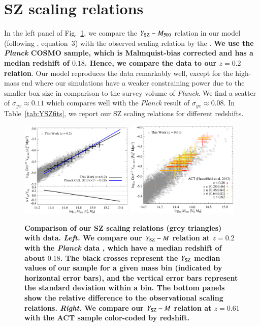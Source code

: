 \documentclass[useAMS,usenatbib]{mn2e}
\begin{document}
\section{SZ scaling relations}
\label{sec:5}
In the left panel of Fig.~\ref{fig:SZ_M}, we compare the $Y_{{\mathrm{SZ}}}-M_{500}$
relation in our model (following \citealp{2012ApJ...758...74B}, equation~3) with
the observed scaling relation by the \cite{2013arXiv1303.5080P}. {\bf We use the
  \emph{Planck} COSMO sample, which is Malmquist-bias corrected and has a median
  redshift of $0.18$. Hence, we compare the data to our $z=0.2$ relation}. Our
model reproduces the data remarkably well, except for the high-mass end where
our simulations have a weaker constraining power due to the smaller box size in
comparison to the survey volume of {\em Planck}. We find a scatter of
$\sigma_{yx} \approx 0.11$ which compares well with the \emph{Planck} result of
$\sigma_{yx} \approx 0.08$. In Table~\ref{tab:YSZfits}, we report our SZ scaling
relations for different redshifts.

\begin{figure} 
\centering
\includegraphics[width=0.48\textwidth]{figures/sz_m.eps}
\includegraphics[width=0.48\textwidth]{figures/sz_m_ACT.eps}
\caption{{\bf Comparison of our SZ scaling relations (grey triangles) with
    data. \emph{Left.}  We compare our $Y_{{\mathrm{SZ}}}-M$ relation at $z=0.2$ with
    the {\em Planck} data \citep{2013arXiv1303.5080P}, which have a median
    redshift of about $0.18$.  The black crosses represent the $Y_{{\mathrm{SZ}}}$
    median values of our sample for a given mass bin (indicated by horizontal
    error bars), and the vertical error bars represent the standard deviation
    within a bin. The bottom panels show the relative difference to the
    observational scaling relations. \emph{Right.} We compare our
    $Y_{{\mathrm{SZ}}}-M$ relation at $z=0.61$ with the ACT sample
    \protect\citep{2013JCAP...07..008H} color-coded by redshift.}}
\label{fig:SZ_M}
\end{figure}
\end{document}
